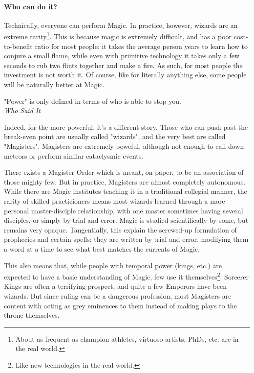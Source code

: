 \paragraph{Who can do it?}

Technically, everyone can perform Magic. In practice, however, wizards are an extreme rarity\footnote{About as frequent as champion athletes, virtuoso artists, PhDs, etc. are in the real world.}. This is because magic is extremely difficult, and has a poor cost-to-benefit ratio for most people: it takes the average person years to learn how to conjure a small flame, while even with primitive technology it takes only a few seconds to rub two flints together and make a fire. As such, for most people the investment is not worth it. Of course, like for literally anything else, some people will be naturally better at Magic. 


\begin{rpg-quotebox}
    "Power" is only defined in terms of who is able to stop you. \\ \textendash \textit{Who Said It}
\end{rpg-quotebox}

Indeed, for the more powerful, it's a different story. Those who can push past the break-even point are usually called "wizards", and the very best are called "Magisters". Magisters are extremely poweful, although not enough to call down meteors or perform similar cataclysmic events.

There exists a Magister Order which is meant, on paper, to be an association of those mighty few. But in practice, Magisters are almost completely autonomous. While there are Magic institutes teaching it in a traditional collegial manner, the rarity of skilled practicioners means most wizards learned through a more personal master-disciple relationship, with one master sometimes having several disciples, or simply by trial and error. Magic is studied scientifically by some, but remains very opaque. Tangentially, this explain the screwed-up formulation of prophecies and certain spells: they are written by trial and error, modifying them a word at a time to see what best matches the currents of Magic. 

This also means that, while people with temporal power (kings, etc.) are expected to have a basic understanding of Magic, few use it themselves\footnote{Like new technologies in the real world.}. Sorcerer Kings are often a terrifying prospect, and quite a few Emperors have been wizards. But since ruling can be a dangerous profession, most Magisters are content with acting as grey eminences to them instead of making plays to the throne themselves.


